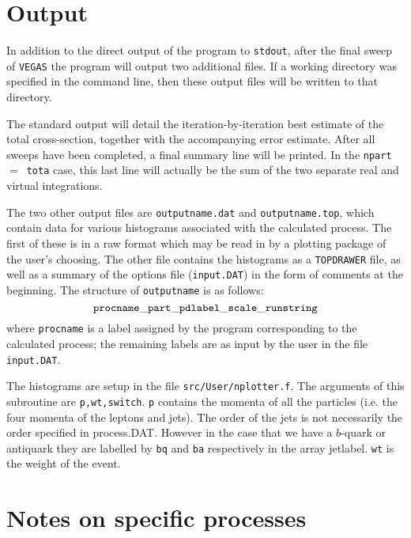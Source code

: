 \documentclass[12pt]{article}
\begin{document}
\section{Output}
 
In addition to the direct output of the program to {\tt stdout}, after
the final sweep of {\tt VEGAS} the program will output two additional files.
If a working directory was specified in the command line, then these
output files will be written to that directory.

The standard output will detail the iteration-by-iteration best estimate
of the total cross-section, together with the accompanying error estimate.
After all sweeps have been completed, a final summary line will be printed.
In the {\tt npart}~$=$~{\tt tota} case, this last line will actually be the
sum of the two separate real and virtual integrations.

The two other output files are {\tt outputname.dat} and
{\tt outputname.top}, which contain data for various histograms associated
with the calculated process. The first of these is in a raw format 
which may be read in by a plotting package of the user's choosing. The
other file contains the histograms as a {\tt TOPDRAWER} file, as well
as a summary of the options file ({\tt input.DAT}) in the form of
comments at the beginning. The structure
of {\tt outputname} is as follows:
\begin{displaymath}
{\tt procname\_part\_pdlabel\_scale\_runstring}
\end{displaymath}
where {\tt procname} is a label assigned by the program corresponding to
the calculated process; the remaining labels are as input by the user
in the file {\tt input.DAT}.

The histograms are  setup in the file {\tt src/User/nplotter.f}. The arguments of this
subroutine are { \tt p,wt,switch}. {\tt p} contains the momenta of all the particles
(i.e. the four momenta of the leptons and jets). The order of the jets is not
necessarily the  order specified in process.DAT.  However in the case that we have a 
$b$-quark or antiquark they are labelled by {\tt bq} and {\tt ba} respectively
in the array jetlabel. {\tt wt} is the weight of the event.  



\section{Notes on specific processes}
\label{sec:specific}
\end{document}
